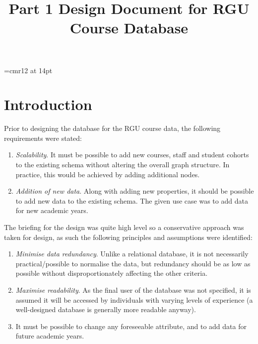 \documentclass[10pt]{article}
\begin{document}
\font\myfont=cmr12 at 14pt
\title{{\myfont Part 1 Design Document for RGU Course Database }}
\author{\vspace{-10ex}}
\date{\vspace{-10ex}}
\maketitle
\vspace{-1cm}


\section{Introduction}
% 
% 
% 
% 
Prior to designing the database for the RGU course data, the following requirements were stated:
\begin{enumerate}
\item  \textit{Scalability}. It must be possible to add new courses, staff and student cohorts to the existing schema without altering the overall graph structure. In practice, this would be achieved by adding additional nodes.
\item \textit{Addition of new data}. Along with adding new properties, it should be possible to add new data to the existing schema. The given use case was to add data for new academic years.
\end{enumerate}
The briefing for the design was quite high level so a conservative approach was taken for design, as such the following principles and assumptions were identified:
\begin{enumerate}[label=\Alph*]
\item \textit{Minimise data redundancy}. Unlike a relational database, it is not necessarily practical/possible to normalise the data, but redundancy should be as low as possible without disproportionately affecting the other criteria.
\item \textit{ Maximise readability}. As the final user of the database was not specified, it is assumed it will be accessed by individuals with varying levels of experience (a well-designed database is generally more readable anyway). 
\item It must be possible to change any foreseeable attribute, and to add data for future academic years.

\end{enumerate}
\end{document}
